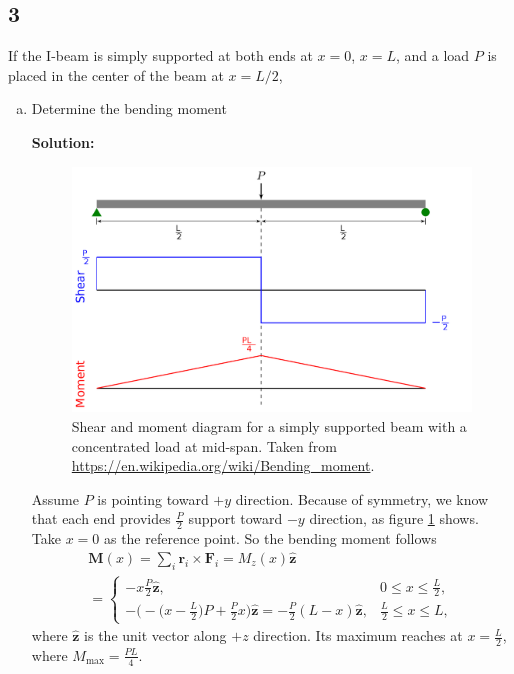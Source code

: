 \documentclass[12pt]{article}
\begin{document}
\subsection{3}
If the I-beam is simply supported at both ends at $x=0$, $x=L$, and a load $P$ is placed in the center of the beam at $x=L/2$,
\begin{enumerate}[(a)]
	\item Determine the bending moment

	      \textbf{Solution:}
	      \begin{figure}[h]
		      \centering
		      \includegraphics[width=0.6\linewidth]{images/support2}
		      \caption{Shear and moment diagram for a simply supported beam with a concentrated load at mid-span. Taken from \url{https://en.wikipedia.org/wiki/Bending_moment}.}
		      \label{fig:support}
	      \end{figure}
	      Assume $P$ is pointing toward $+y$ direction.
	      Because of symmetry, we know that each end provides $\frac{ P }{ 2 }$ support toward $-y$ direction, as figure \ref{fig:support}
	      shows. Take $x = 0$ as the reference point.
	      So the bending moment follows
	      \begin{multline}
		      \bm{M}(x) = \sum_{i} \bm{r}_{i} \times \bm{F}_{i} = M_z(x) \hat{\bm{z}}\\
		      = \begin{cases}
			      -x \frac{ P }{ 2 } \hat{\bm{z}},                                                                                        & 0 \le x \le \frac{L}{2},     \\
			      -\Big( - \big( x - \frac{ L }{ 2 } \big) P + \frac{ P }{ 2 }x \Big)\hat{\bm{z}} = -\frac{ P }{ 2 } (L - x)\hat{\bm{z}}, & \frac{ L }{ 2 } \le x \le L,
		      \end{cases}
	      \end{multline}
	      where $\hat{\bm{z}}$ is the unit vector along $+z$ direction.
	      Its maximum reaches at $x = \frac{ L }{ 2 }$, where $M_\text{max} = \frac{ P L }{ 4 }$.


\end{enumerate}
\end{document}
